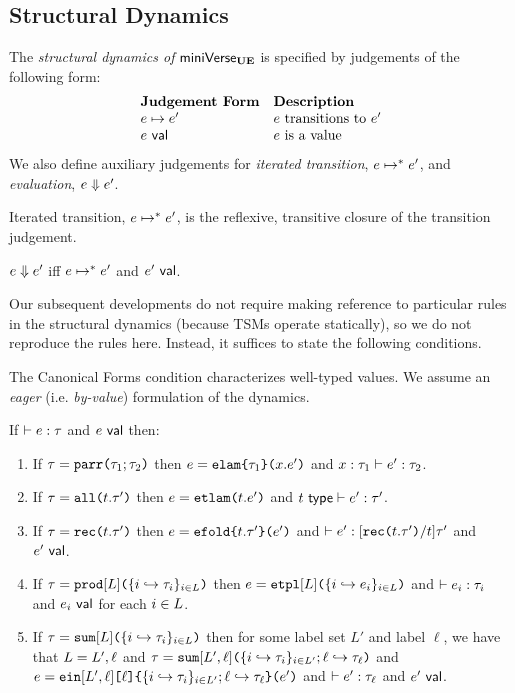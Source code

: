 \subsection{Structural Dynamics}\label{sec:dynamics-U}
The \emph{structural dynamics of }$\mathsf{miniVerse}_\textbf{UE}$ is specified by judgements of the following form:
\[\begin{array}{ll}
\textbf{Judgement Form} & \textbf{Description}\\
e \mapsto e' & \text{$e$ transitions to $e'$}\\
e~\mathsf{val} & \text{$e$ is a value}
\end{array}\]
We also define auxiliary judgements for \emph{iterated transition}, $e \mapsto^{*} e'$, and \emph{evaluation}, $e \Downarrow e'$.

\begin{definition}\label{defn:iterated-transition-U} Iterated transition, $e \mapsto^{*} e'$, is the reflexive, transitive closure of the transition judgement.\end{definition}

\begin{definition}[Evaluation]\label{defn:evaluation-U}  $e \Downarrow e'$ iff $e \mapsto^{*} e'$ and $e'~\mathsf{val}$. \end{definition}

Our subsequent developments do not require making reference to particular rules in the structural dynamics (because TSMs operate statically), so we do not reproduce the rules here. Instead, it suffices to state the following conditions.

The Canonical Forms condition characterizes well-typed values. We assume an \emph{eager} (i.e. \emph{by-value}) formulation of the dynamics. 
\begin{condition}\label{condition:canonical-forms-U} If $\vdash e : \tau$ and $e~\mathsf{val}$ then:
\begin{enumerate}
\item If $\tau=\texttt{parr}\texttt{(}\tau_1; \tau_2\texttt{)}$ then $e=\texttt{elam}\texttt{\{}\tau_1\texttt{\}(}x.e'\texttt{)}$ and $x : \tau_1 \vdash e' : \tau_2$.
\item If $\tau=\texttt{all}\texttt{(}t.\tau'\texttt{)}$ then $e=\texttt{etlam}\texttt{(}t.e'\texttt{)}$ and $t~\mathsf{type} \vdash e' : \tau'$.
\item If $\tau=\texttt{rec}\texttt{(}t.\tau'\texttt{)}$ then $e=\texttt{efold}\texttt{\{}t.\tau'\texttt{\}(}e'\texttt{)}$ and $\vdash e' : [\texttt{rec}\texttt{(}t.\tau'\texttt{)}/t]\tau'$ and $e'~\mathsf{val}$. 
\item If $\tau=\texttt{prod}[L]\texttt{(}\{i \hookrightarrow \tau_{i}\}_{i \in L}\texttt{)}$ then $e=\texttt{etpl}[L]\texttt{(}\{i \hookrightarrow e_{i}\}_{i \in L}\texttt{)}$ and $\vdash e_i : \tau_i$ and $e_i~\mathsf{val}$ for each $i \in L$.
\item If $\tau=\texttt{sum}[L]\texttt{(}\{i \hookrightarrow \tau_{i}\}_{i \in L}\texttt{)}$ then for some label set $L'$ and label $\ell$, we have that $L=L', \ell$ and $\tau=\texttt{sum}[L', \ell]\texttt{(}\{i \hookrightarrow \tau_{i}\}_{i \in L'}; \ell \hookrightarrow \tau_\ell\texttt{)}$ and $e=\texttt{ein}[L', \ell]\texttt{[}\ell\texttt{]\{}\{i \hookrightarrow \tau_{i}\}_{i \in L'}; \ell \hookrightarrow \tau_\ell\texttt{\}(}e'\texttt{)}$ and $\vdash e' : \tau_\ell$ and $e'~\mathsf{val}$.
\end{enumerate}\end{condition}

